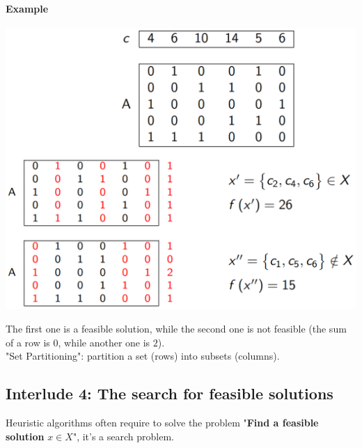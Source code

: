 \paragraph{Example}
\begin{center}
	\includegraphics[width=\columnwidth]{img/SPP1}
\end{center}
The first one is a feasible solution, while the second one is not feasible (the sum of a row is $0$, while another one is $2$).\\

"Set Partitioning": partition a set (rows) into subsets (columns).\\

\newpage

\subsection*{Interlude 4: The search for feasible solutions}
Heuristic algorithms often require to solve the problem "\textbf{Find a feasible solution} $x \in X$", it's a search problem. \\

